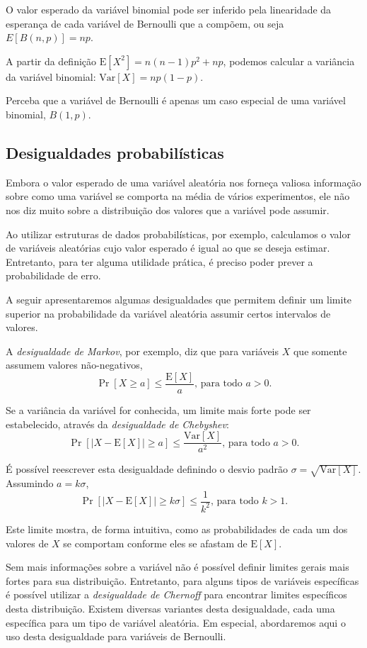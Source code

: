 O valor esperado da variável binomial pode ser inferido pela linearidade da esperança de cada variável de Bernoulli que a compõem, ou seja $E[B(n, p)] = np$. 

A partir da definição $\text{E}[X^2] = n (n-1) p^2 + np$, podemos calcular a variância da variável binomial: $\text{Var}[X] = np(1-p)$.

Perceba que a variável de Bernoulli é apenas um caso especial de uma variável binomial, $B(1, p)$.

\subsection{Desigualdades probabilísticas}

Embora o valor esperado de uma variável aleatória nos forneça valiosa informação sobre como uma variável se comporta na média de vários experimentos, ele não nos diz muito sobre a distribuição dos valores que a variável pode assumir.

Ao utilizar estruturas de dados probabilísticas, por exemplo, calculamos o valor de variáveis aleatórias cujo valor esperado é igual ao que se deseja estimar. Entretanto, para ter alguma utilidade prática, é preciso poder prever a probabilidade de erro.

A seguir apresentaremos algumas desigualdades que permitem definir um limite superior na probabilidade da variável aleatória assumir certos intervalos de valores.

A \emph{desigualdade de Markov}, por exemplo, diz que para variáveis $X$ que somente assumem valores não-negativos,
\[
    \Pr[X \geq a] \leq \frac{\text{E}[X]}{a} \text{, para todo } a > 0 \text{.}
\]

Se a variância da variável for conhecida, um limite mais forte pode ser estabelecido, através da \emph{desigualdade de Chebyshev}:
\[
    \Pr[|X - \text{E}[X]| \geq a] \leq \frac{\text{Var}[X]}{a^2} \text{, para todo } a > 0 \text{.}
\]

É possível reescrever esta desigualdade definindo o desvio padrão $\sigma = \sqrt{\text{Var}[X]}$. Assumindo $a = k\sigma$,
\[
    \Pr[|X - \text{E}[X]| \geq k\sigma] \leq \frac{1}{k^2} \text{, para todo } k > 1 \text{.}
\]

Este limite mostra, de forma intuitiva, como as probabilidades de cada um dos valores de $X$ se comportam conforme eles se afastam de $\text{E}[X]$.

Sem mais informações sobre a variável não é possível definir limites gerais mais fortes para sua distribuição. Entretanto, para alguns tipos de variáveis específicas é possível utilizar a \emph{desigualdade de Chernoff} para encontrar limites específicos desta distribuição. Existem diversas variantes desta desigualdade, cada uma específica para um tipo de variável aleatória. Em especial, abordaremos aqui o uso desta desigualdade para variáveis de Bernoulli.

